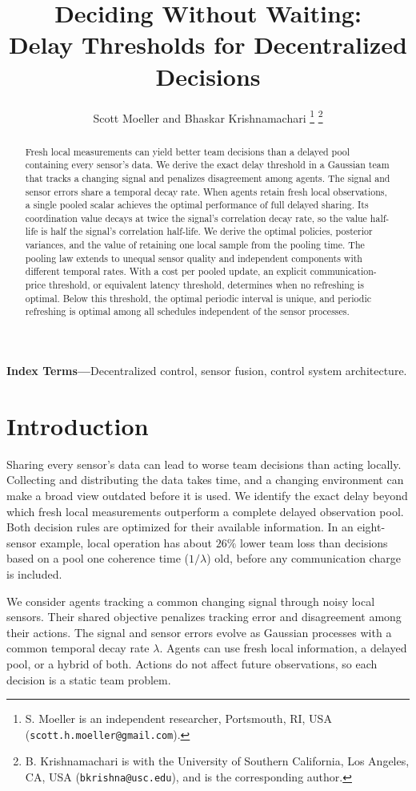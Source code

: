 \documentclass[letterpaper,10pt,conference]{ieeeconf}
\title{Deciding Without Waiting:\\Delay Thresholds for Decentralized Decisions}
\author{Scott Moeller and Bhaskar Krishnamachari%
\thanks{S. Moeller is an independent researcher, Portsmouth, RI, USA
(\texttt{scott.h.moeller@gmail.com}).}%
\thanks{B. Krishnamachari is with the University of Southern California,
Los Angeles, CA, USA (\texttt{bkrishna@usc.edu}), and is the corresponding author.}}
\begin{document}
\maketitle
\thispagestyle{empty}
\pagestyle{empty}
\begin{abstract}
Fresh local measurements can yield better team decisions than a delayed pool containing every sensor's data. We derive the exact delay threshold in a Gaussian team that tracks a changing signal and penalizes disagreement among agents. The signal and sensor errors share a temporal decay rate. When agents retain fresh local observations, a single pooled scalar achieves the optimal performance of full delayed sharing. Its coordination value decays at twice the signal's correlation decay rate, so the value half-life is half the signal's correlation half-life. We derive the optimal policies, posterior variances, and the value of retaining one local sample from the pooling time. The pooling law extends to unequal sensor quality and independent components with different temporal rates. With a cost per pooled update, an explicit communication-price threshold, or equivalent latency threshold, determines when no refreshing is optimal. Below this threshold, the optimal periodic interval is unique, and periodic refreshing is optimal among all schedules independent of the sensor processes.
\end{abstract}
\noindent\textbf{Index Terms---}Decentralized control, sensor fusion, control system architecture.

\section{Introduction}
Sharing every sensor's data can lead to worse team decisions than acting locally. Collecting and distributing the data takes time, and a changing environment can make a broad view outdated before it is used. We identify the exact delay beyond which fresh local measurements outperform a complete delayed observation pool. Both decision rules are optimized for their available information. In an eight-sensor example, local operation has about $26\%$ lower team loss than decisions based on a pool one coherence time ($1/\lambda$) old, before any communication charge is included.

We consider agents tracking a common changing signal through noisy local sensors. Their shared objective penalizes tracking error and disagreement among their actions. The signal and sensor errors evolve as Gaussian processes with a common temporal decay rate $\lambda$. Agents can use fresh local information, a delayed pool, or a hybrid of both. Actions do not affect future observations, so each decision is a static team problem.
\end{document}
